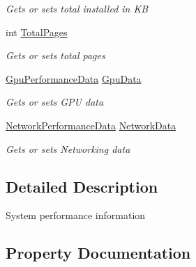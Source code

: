 \begin{DoxyCompactItemize}
\begin{DoxyCompactList}\small\item\em Gets or sets total installed in KB \end{DoxyCompactList}\item 
int \hyperlink{class_microsoft_1_1_tools_1_1_windows_device_portal_1_1_device_portal_1_1_system_performance_information_ac3627bdae82b51187923a8497a499e0a}{Total\+Pages}
\begin{DoxyCompactList}\small\item\em Gets or sets total pages \end{DoxyCompactList}\item 
\hyperlink{class_microsoft_1_1_tools_1_1_windows_device_portal_1_1_device_portal_1_1_gpu_performance_data}{Gpu\+Performance\+Data} \hyperlink{class_microsoft_1_1_tools_1_1_windows_device_portal_1_1_device_portal_1_1_system_performance_information_a83e4e05e9f140780db16f237d15214e4}{Gpu\+Data}
\begin{DoxyCompactList}\small\item\em Gets or sets G\+PU data \end{DoxyCompactList}\item 
\hyperlink{class_microsoft_1_1_tools_1_1_windows_device_portal_1_1_device_portal_1_1_network_performance_data}{Network\+Performance\+Data} \hyperlink{class_microsoft_1_1_tools_1_1_windows_device_portal_1_1_device_portal_1_1_system_performance_information_aedf4c5c17868eff693f9b45223bad169}{Network\+Data}
\begin{DoxyCompactList}\small\item\em Gets or sets Networking data \end{DoxyCompactList}\end{DoxyCompactItemize}


\subsection{Detailed Description}
System performance information 



\subsection{Property Documentation}
